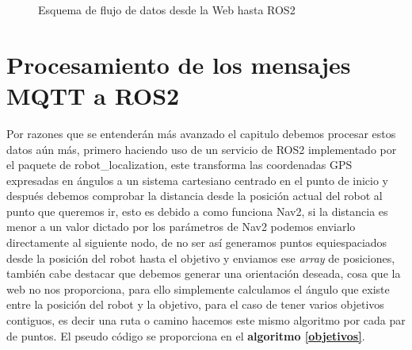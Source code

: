 \begin{figure}[h]
\begin{center}
\end{center}
\caption{Esquema de flujo de datos desde la Web hasta ROS2}
\label{fig:esquema_flujo_datos}
\end{figure}


\section{Procesamiento de los mensajes MQTT a ROS2}
Por razones que se entenderán más avanzado el capitulo debemos procesar estos datos aún más, primero haciendo uso de un servicio de ROS2 
implementado por el paquete de robot\_localization, este transforma las coordenadas GPS expresadas en ángulos a un sistema cartesiano 
centrado en el punto de inicio y después debemos comprobar la distancia desde la posición actual del robot al punto que queremos ir, 
esto es debido a como funciona Nav2, si la distancia es menor a un valor dictado por los parámetros de Nav2 podemos enviarlo directamente 
al siguiente nodo, de no ser así generamos puntos equiespaciados desde la posición del robot hasta el objetivo y enviamos ese \textit{array} 
de posiciones, también cabe destacar que debemos generar una orientación deseada, cosa que la web no nos proporciona, para ello simplemente 
calculamos el ángulo que existe entre la posición del robot y la objetivo, para el caso de tener varios objetivos contiguos, es decir una 
ruta o camino hacemos este mismo algoritmo por cada par de puntos. El pseudo código se proporciona en el \textbf{algoritmo \ref{objetivos}}.

